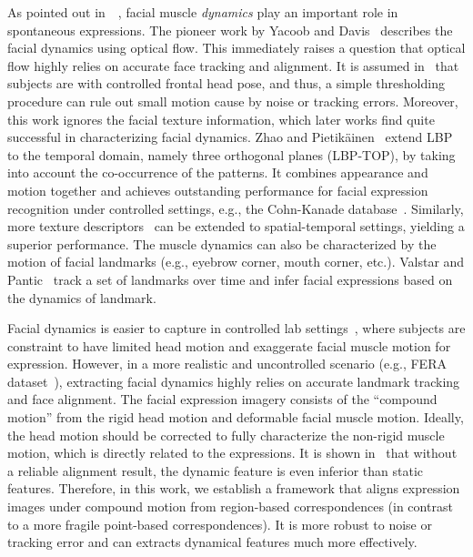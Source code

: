 \documentclass[journal]{IEEEtran}
\begin{document}
As pointed out in~\cite{Ekman2005}~\cite{Ambadar05}, facial muscle \textit{dynamics} play an important role in spontaneous expressions. The pioneer work by Yacoob and Davis~\cite{Yacoob_PAMI96} describes the facial dynamics using optical flow. This immediately raises a question that optical flow highly relies on accurate face tracking and alignment. It is assumed in~\cite{Yacoob_PAMI96} that subjects are with controlled frontal head pose, and thus, a simple thresholding procedure can rule out small motion cause by noise or tracking errors. Moreover, this work ignores the facial texture information, which later works find quite successful in characterizing facial dynamics. Zhao and Pietik\"ainen~\cite{Zhao_PAMI07} extend LBP to the temporal domain, namely three orthogonal planes (LBP-TOP), by taking into account the co-occurrence of the patterns. It combines appearance and motion together and achieves outstanding performance for facial expression recognition under controlled settings, e.g., the Cohn-Kanade database~\cite{CKplus}. Similarly, more texture descriptors~\cite{LPQ-TOP} can be extended to spatial-temporal settings, yielding a superior performance. The muscle dynamics can also be characterized by the motion of facial landmarks (e.g., eyebrow corner, mouth corner, etc.). Valstar and Pantic~\cite{Valstar_SMCB12} track a set of landmarks over time and infer facial expressions based on the dynamics of landmark. 

Facial dynamics is easier to capture in controlled lab settings~\cite{CKplus}, where subjects are constraint to have limited head motion and exaggerate facial muscle motion for expression. However, in a more realistic and uncontrolled scenario (e.g., FERA dataset~\cite{Valstar_FERA11}), extracting facial dynamics highly relies on accurate landmark tracking and face alignment. The facial expression imagery consists of the ``compound motion'' from the rigid head motion and deformable facial muscle motion. Ideally, the head motion should be corrected to fully characterize the non-rigid muscle motion, which is directly related to the expressions. It is shown in~\cite{Valstar12}\cite{Yang_SMCB12} that without a reliable alignment result, the dynamic feature is even inferior than static features. Therefore, in this work, we establish a framework that aligns expression images under compound motion from region-based correspondences (in contrast to a more fragile point-based correspondences). It is more robust to noise or tracking error and can extracts dynamical features much more effectively. 
\end{document}
